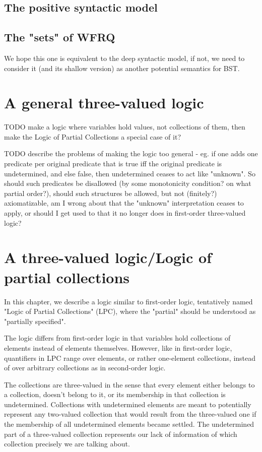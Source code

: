 \documentclass[oneside,12pt]{book}
\theoremstyle{definition}
\theoremstyle{remark}
\begin{document}
\section{The positive syntactic model}

\section{The "sets" of WFRQ}
We hope this one is equivalent to the deep syntactic model, if not, we need to
consider it (and its shallow version) as another potential semantics for BST.


\chapter{A general three-valued logic}
TODO make a logic where variables hold values, not collections of them,
then make the Logic of Partial Collections a special case of it?

TODO describe the problems of making the logic too general - eg. if one adds one predicate
per original predicate that is true iff the original predicate is undetermined,
and else false, then undetermined ceases to act like "unknown". So should
such predicates be disallowed (by some monotonicity condition? on what partial order?),
should such structures be allowed, but not (finitely?) axiomatizable, am I wrong about
that the "unknown" interpretation ceases to apply, or should I get used to that it no
longer does in first-order three-valued logic?

\chapter{A three-valued logic/Logic of partial collections}
In this chapter, we describe a logic similar to first-order logic, tentatively named
"Logic of Partial Collections" (LPC), where the "partial" should be understood
as "partially specified".

The logic differs from first-order logic in that variables hold collections
of elements instead of elements themselves. However, like in first-order logic,
quantifiers in LPC range over elements, or rather one-element collections,
instead of over arbitrary collections as in second-order logic.

The collections are three-valued in the sense that every element either belongs
to a collection, doesn't belong to it, or its membership in that collection is
undetermined. Collections with undetermined elements are meant to potentially represent
any two-valued collection that would result from the three-valued one if the
membership of all undetermined elements became settled. The undetermined part
of a three-valued collection represents our lack of information of which collection
precisely we are talking about.
\end{document}
